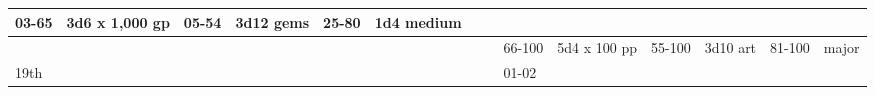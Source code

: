 \begin{longtable}{llllllllllllll}
{\begin{minipage}[t]{0.393in}
03-65\end{minipage}} & \multicolumn{1}{p{0.469in}|}{\begin{minipage}[t]{0.469in}\raggedright
3d6 x 1,000 gp\end{minipage}} & \multicolumn{1}{p{0.923in}|}{\begin{minipage}[t]{0.923in}\raggedright
05-54\end{minipage}} & \multicolumn{1}{p{0.469in}|}{\begin{minipage}[t]{0.469in}\raggedright
3d12 gems\end{minipage}} & \multicolumn{1}{p{0.626in}|}{\begin{minipage}[t]{0.626in}\raggedright
25-80\end{minipage}} & \multicolumn{1}{p{0.469in}|}{\begin{minipage}[t]{0.469in}\centering
1d4 medium\end{minipage}}\\
\hline
\multicolumn{8}{p{1.150in}|}{\begin{minipage}[t]{1.150in}\centering
\end{minipage}} & \multicolumn{1}{|p{0.393in}|}{\begin{minipage}[t]{0.393in}\raggedright
66-100\end{minipage}} & \multicolumn{1}{p{0.469in}|}{\begin{minipage}[t]{0.469in}\raggedright
5d4 x 100 pp\end{minipage}} & \multicolumn{1}{p{0.923in}|}{\begin{minipage}[t]{0.923in}\raggedright
55-100\end{minipage}} & \multicolumn{1}{p{0.469in}|}{\begin{minipage}[t]{0.469in}\raggedright
3d10 art\end{minipage}} & \multicolumn{1}{p{0.626in}|}{\begin{minipage}[t]{0.626in}\raggedright
81-100\end{minipage}} & \multicolumn{1}{p{0.469in}|}{\begin{minipage}[t]{0.469in}\centering
1 major\end{minipage}}\\
\hline
\multicolumn{8}{p{1.150in}|}{\begin{minipage}[t]{1.150in}\centering
19th\end{minipage}} & \multicolumn{1}{|p{0.393in}|}{\begin{minipage}[t]{0.393in}\raggedright
01-02\end{minipage}} & \multicolumn{1}{p{0.469in}|}{\begin{minipage}[t]{0.469in}\raggedright

\end{minipage}}
\end{longtable}
